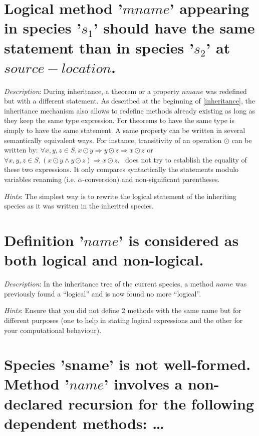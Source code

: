 \section*{Logical method '$mname$' appearing in species '$s_1$' should
  have the same statement than in species '$s_2$' at
  $source-location$.}

{\em Description}: During inheritance, a theorem or a property $nmane$
was redefined but with a different statement. As described at the
beginning of \ref{inheritance}, the inheritance mechanism also allows
to redefine methods already existing as long as they keep the same
type expression.  For theorems to have the same type is simply to have
the same statement. A same property can be written in several
semantically equivalent ways. For instance, transitivity of an
operation $\odot$ can be written by:
$\forall x, y, z \in S, x \odot y \Rightarrow y \odot z \Rightarrow
x \odot z$
or
$\forall x, y, z \in S, (x \odot y \wedge y \odot z) \Rightarrow
x \odot z$.
\focal\ does not try to establish the equality of these two
expressions. It only compares syntactically the statements modulo
variables renaming (i.e. $\alpha$-conversion) and non-significant
parentheses.

{\em Hints}: The simplest way is to rewrite the logical statement of
the inheriting species as it was written in the inherited species.



\section*{Definition '$name$' is considered as both  logical and
  non-logical.}

{\em Description}: In the inheritance tree of the current species, a
method $name$ was previously found a ``logical'' and is now found no
more ``logical''.

{\em Hints}: Ensure that you did not define 2 methods with the same
name but for different purposes (one to help in stating logical
expressions and the other for your computational behaviour).



\section*{Species 'sname' is not well-formed. Method  '$name$' involves
  a non-declared recursion for the following dependent methods: \ldots}

